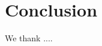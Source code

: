 \documentclass[iop]{emulateapj}
\begin{document}
\section{Conclusion}














\acknowledgments

We thank ....





\begin{thebibliography}{}


\end{thebibliography}{}
\end{document}
